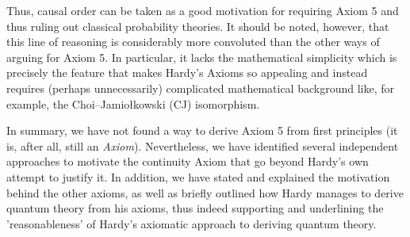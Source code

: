 \documentclass[11pt, a4paper]{article}
\begin{document}
Thus, causal order can be taken as a good motivation for requiring Axiom 5 and thus ruling out classical probability theories. It should be noted, however, that this line of reasoning is considerably more convoluted than the other ways of arguing for Axiom 5. In particular, it lacks the mathematical simplicity which is precisely the feature that makes Hardy's Axioms so appealing and instead requires (perhaps unnecessarily) complicated mathematical background like, for example, the Choi–Jamio\l kowski (CJ) isomorphism.\par
\vspace{8pt}
In summary, we have not found a way to derive Axiom 5 from first principles (it is, after all, still an \emph{Axiom}). Nevertheless, we have identified several independent approaches to motivate the continuity Axiom that go beyond Hardy's own attempt to justify it. In addition, we have stated and explained the motivation behind the other axioms, as well as briefly outlined how Hardy manages to derive quantum theory from his axioms, thus indeed supporting and underlining the 'reasonableness' of Hardy's axiomatic approach to deriving quantum theory.


\newpage
\printbibliography
\end{document}
